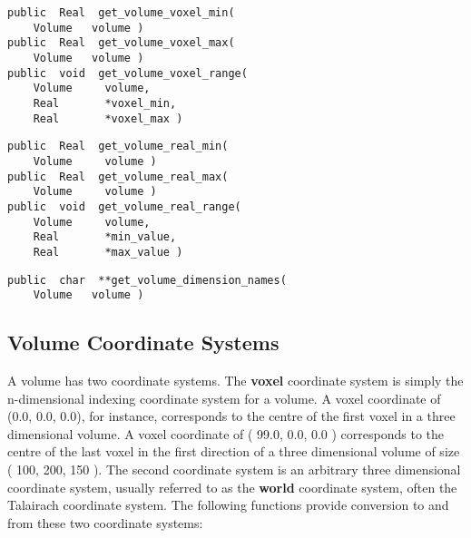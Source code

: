 
{\bf\begin{verbatim}
public  Real  get_volume_voxel_min(
    Volume   volume )
public  Real  get_volume_voxel_max(
    Volume   volume )
public  void  get_volume_voxel_range(
    Volume     volume,
    Real       *voxel_min,
    Real       *voxel_max )
\end{verbatim}}


{\bf\begin{verbatim}
public  Real  get_volume_real_min(
    Volume     volume )
public  Real  get_volume_real_max(
    Volume     volume )
public  void  get_volume_real_range(
    Volume     volume,
    Real       *min_value,
    Real       *max_value )
\end{verbatim}}


{\bf\begin{verbatim}
public  char  **get_volume_dimension_names(
    Volume   volume )
\end{verbatim}}


\subsection{Volume Coordinate Systems}

A volume has two coordinate systems.  The {\bf voxel} coordinate
system is simply the n-dimensional indexing coordinate system for a
volume.  A voxel coordinate of (0.0, 0.0, 0.0), for instance, corresponds
to the centre of the first voxel in a three dimensional volume.  A voxel
coordinate of ( 99.0, 0.0, 0.0 ) corresponds to the centre of the last
voxel in the first direction of a three dimensional volume of size (
100, 200, 150 ).  The second coordinate system is an arbitrary
three dimensional coordinate system, usually referred to as the
{\bf world} coordinate system, often
the Talairach coordinate system.  The following functions provide
conversion to and from these two coordinate systems:

